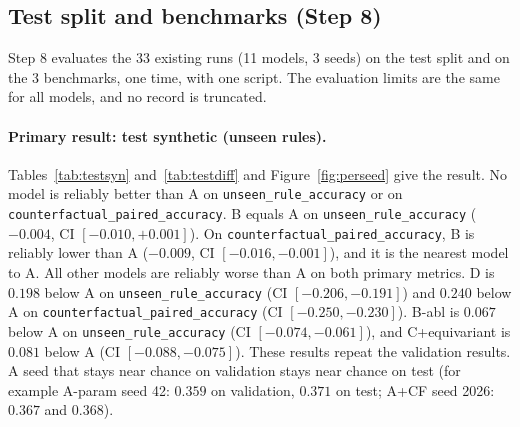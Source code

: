 \documentclass[11pt,a4paper]{article}
\newcommand{\ura}{\texttt{unseen\_\allowbreak rule\_\allowbreak accuracy}}
\newcommand{\cpa}{\texttt{counterfactual\_\allowbreak paired\_\allowbreak accuracy}}
\begin{document}
\subsection{Test split and benchmarks (Step 8)}\label{sec:testres}

Step 8 evaluates the 33 existing runs (11 models, 3 seeds) on the test split and on the 3 benchmarks, one time, with one script.
The evaluation limits are the same for all models, and no record is truncated.

\paragraph{Primary result: test synthetic (unseen rules).}
Tables~\ref{tab:testsyn} and~\ref{tab:testdiff} and Figure~\ref{fig:perseed} give the result.
No model is reliably better than A on \ura{} or on \cpa{}.
B equals A on \ura{} ($-0.004$, CI $[-0.010, +0.001]$).
On \cpa{}, B is reliably lower than A ($-0.009$, CI $[-0.016, -0.001]$), and it is the nearest model to A.
All other models are reliably worse than A on both primary metrics.
D is $0.198$ below A on \ura{} (CI $[-0.206, -0.191]$) and $0.240$ below A on \cpa{} (CI $[-0.250, -0.230]$).
B-abl is $0.067$ below A on \ura{} (CI $[-0.074, -0.061]$), and C+equivariant is $0.081$ below A (CI $[-0.088, -0.075]$).
These results repeat the validation results.
A seed that stays near chance on validation stays near chance on test (for example A-param seed 42: $0.359$ on validation, $0.371$ on test; A+CF seed 2026: $0.367$ and $0.368$).
\end{document}
